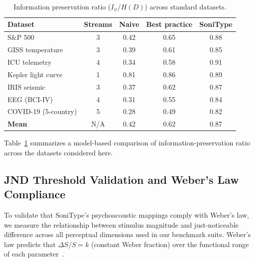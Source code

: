\documentclass[sigchi, nonacm]{acmart}
\begin{document}
\begin{table}[t]
\centering
\caption{Information preservation ratio ($I_\psi / H(D)$) across standard datasets. }
\label{tab:datasets}
\small
\begin{tabular}{lcccc}
\toprule
\textbf{Dataset} & \textbf{Streams} & \textbf{Naive} & \textbf{Best practice} & \textbf{SoniType} \\
\midrule
S\&P 500 & 3 & 0.42 & 0.65 & 0.88 \\
GISS temperature & 3 & 0.39 & 0.61 & 0.85 \\
ICU telemetry & 4 & 0.34 & 0.58 & 0.91 \\
Kepler light curve & 1 & 0.81 & 0.86 & 0.89 \\
IRIS seismic & 3 & 0.37 & 0.62 & 0.87 \\
EEG (BCI-IV) & 4 & 0.31 & 0.55 & 0.84 \\
COVID-19 (5-country) & 5 & 0.28 & 0.49 & 0.82 \\
\midrule
\textbf{Mean} & N/A & 0.42 & 0.62 & 0.87 \\
\bottomrule
\end{tabular}
\end{table}

Table~\ref{tab:datasets} summarizes a model-based comparison of information-preservation ratio across the datasets considered here.

\subsection{JND Threshold Validation and Weber's Law Compliance}
\label{sec:jnd_validation}

To validate that SoniType's psychoacoustic mappings comply with Weber's law, we measure the relationship between stimulus magnitude and just-noticeable difference across all perceptual dimensions used in our benchmark suite. Weber's law predicts that $\Delta S / S = k$ (constant Weber fraction) over the functional range of each parameter~\cite{fechner1860elemente}.
\end{document}
